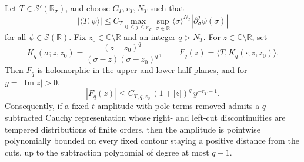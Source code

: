 \begin{proposition}
\label{prop:subtracted-cauchy-transform-tempered-cut}
Let \(T\in\mathcal S'(\mathbb R_\sigma)\), and choose
\(C_T,r_T,N_T\) such that
\begin{equation}
  |\langle T,\psi\rangle|
  \le
  C_T
  \max_{0\le j\le r_T}
  \sup_{\sigma\in\mathbb R}
  \langle \sigma\rangle^{N_T}|\partial_\sigma^j\psi(\sigma)|
  \label{eq:tempered-cut-order-data}
\end{equation}
for all \(\psi\in\mathcal S(\mathbb R)\).  Fix
\(z_0\in\mathbb C\setminus\mathbb R\) and an integer \(q>N_T\).  For
\(z\in\mathbb C\setminus\mathbb R\), set
\begin{equation}
  K_q(\sigma;z,z_0)
  =
  \frac{(z-z_0)^q}{(\sigma-z)(\sigma-z_0)^q},
  \qquad
  F_q(z)=\langle T,K_q(\cdot;z,z_0)\rangle .
  \label{eq:subtracted-cauchy-kernel-tempered-cut}
\end{equation}
Then \(F_q\) is holomorphic in the upper and lower half-planes, and for
\(y=|\operatorname{Im}z|>0\),
\begin{equation}
  |F_q(z)|
  \le
  C_{T,q,z_0}\,
  (1+|z|)^q\,y^{-r_T-1}.
  \label{eq:subtracted-cauchy-tempered-pointwise-bound}
\end{equation}
Consequently, if a fixed-\(t\) amplitude with pole terms removed admits a
\(q\)-subtracted Cauchy representation whose right- and left-cut
discontinuities are tempered distributions of finite orders, then the
amplitude is pointwise polynomially bounded on every fixed contour staying a
positive distance from the cuts, up to the subtraction polynomial of degree
at most \(q-1\).
\end{proposition}

